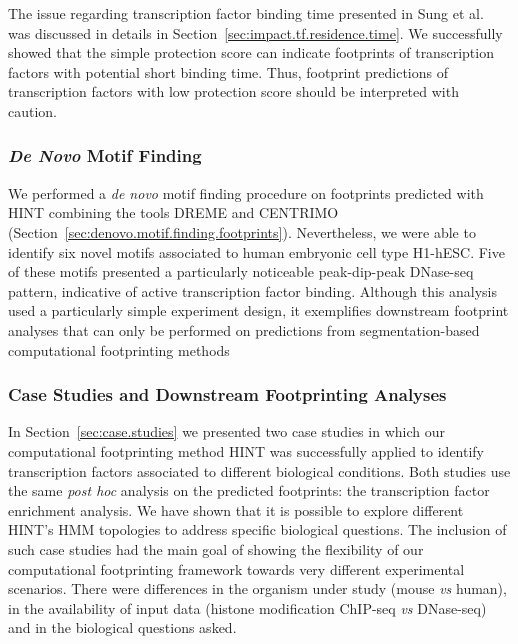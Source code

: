 The issue regarding transcription factor binding time presented in Sung et al.~\cite{sung2014} was discussed in details in Section~\ref{sec:impact.tf.residence.time}. We successfully showed that the simple protection score can indicate footprints of transcription factors with potential short binding time. Thus, footprint predictions of transcription factors with low protection score should be interpreted with caution.

\subsubsection{\emph{De Novo} Motif Finding}

We performed a \emph{de novo} motif finding procedure on footprints predicted with HINT combining the tools DREME and CENTRIMO (Section~\ref{sec:denovo.motif.finding.footprints}). Nevertheless, we were able to identify six novel motifs associated to human embryonic cell type H1-hESC. Five of these motifs presented a particularly noticeable peak-dip-peak DNase-seq pattern, indicative of active transcription factor binding. Although this analysis used a particularly simple experiment design, it exemplifies downstream footprint analyses that can only be performed on predictions from segmentation-based computational footprinting methods

\subsubsection{Case Studies and Downstream Footprinting Analyses}

In Section~\ref{sec:case.studies} we presented two case studies in which our computational footprinting method HINT was successfully applied to identify transcription factors associated to different biological conditions. Both studies use the same \emph{post hoc} analysis on the predicted footprints: the transcription factor enrichment analysis. We have shown that it is possible to explore different HINT's HMM topologies to address specific biological questions. The inclusion of such case studies had the main goal of showing the flexibility of our computational footprinting framework towards very different experimental scenarios. There were differences in the organism under study (mouse \emph{vs} human), in the availability of input data (histone modification ChIP-seq \emph{vs} DNase-seq) and in the biological questions asked.

